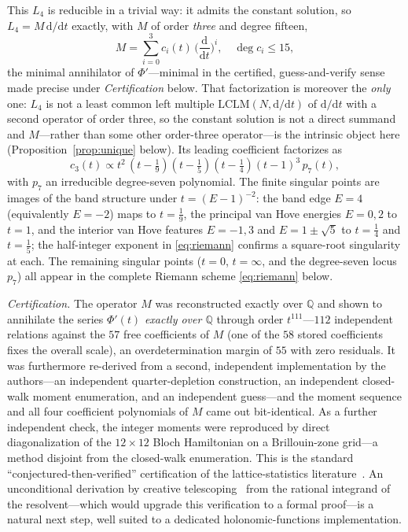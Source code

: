 \documentclass[cntp]{ipart}
\newcommand{\rmd}{\mathrm{d}}
\theoremstyle{plain}
\theoremstyle{remark}
\begin{document}
This $L_4$ is reducible in a trivial way: it admits the constant solution, so $L_4=M\,\rmd/\rmd t$ exactly, with
$M$ of order \emph{three} and degree fifteen,
\begin{equation}
M=\sum_{i=0}^{3}c_i(t)\,\Big(\frac{\rmd}{\rmd t}\Big)^{i},\quad \deg c_i\le 15,
\label{eq:M}
\end{equation}
the minimal annihilator of $\Phi'$---minimal in the certified, guess-and-verify sense
made precise under \emph{Certification} below. That factorization is moreover the \emph{only} one:
$L_4$ is not a least common left multiple $\mathrm{LCLM}(N,\rmd/\rmd t)$ of $\rmd/\rmd t$ with a
second operator of order three, so the constant solution is not a direct summand and $M$---rather
than some other order-three operator---is the intrinsic object here
(Proposition~\ref{prop:unique} below). Its leading coefficient factorizes as
\begin{equation}
c_3(t)\propto t^2\,(t-\tfrac19)(t-\tfrac15)(t-\tfrac14)(t-1)^3\,p_7(t),
\label{eq:lc}
\end{equation}
with $p_7$ an irreducible degree-seven polynomial. The finite singular points are images of the band structure
under $t=(E-1)^{-2}$: the band edge $E=4$ (equivalently $E=-2$) maps to $t=\tfrac19$, the principal van Hove
energies $E=0,2$ to $t=1$, and the interior van Hove features $E=-1,3$ and $E=1\pm\sqrt5$ to $t=\tfrac14$ and
$t=\tfrac15$; the half-integer exponent in \eqref{eq:riemann} confirms a square-root singularity at each. The
remaining singular points ($t=0$, $t=\infty$, and the degree-seven locus $p_7$) all appear in the complete Riemann
scheme \eqref{eq:riemann} below.

\emph{Certification.} The operator $M$ was reconstructed exactly over $\mathbb{Q}$ and shown to annihilate the
series $\Phi'(t)$ \emph{exactly over $\mathbb{Q}$} through order $t^{111}$---$112$ independent relations against
the $57$ free coefficients of $M$ (one of the $58$ stored coefficients fixes the overall scale), an
overdetermination margin of $55$ with zero residuals. It was
furthermore re-derived from a second, independent implementation by the authors---an independent
quarter-depletion construction, an independent closed-walk moment enumeration, and an independent
guess---and the moment sequence and all four coefficient polynomials of $M$ came out bit-identical.
As a further independent check, the
integer moments were reproduced by direct diagonalization of the $12\times12$ Bloch Hamiltonian on a
Brillouin-zone grid---a method disjoint from the closed-walk enumeration. This is the standard
``conjectured-then-verified'' certification of the lattice-statistics literature~\cite{Guttmann2010}. An
unconditional derivation by creative telescoping~\cite{Koutschan2013,Bostan2013} from the rational integrand of
the resolvent---which would upgrade this verification to a formal proof---is a natural next step, well suited to
a dedicated holonomic-functions implementation.
\end{document}

